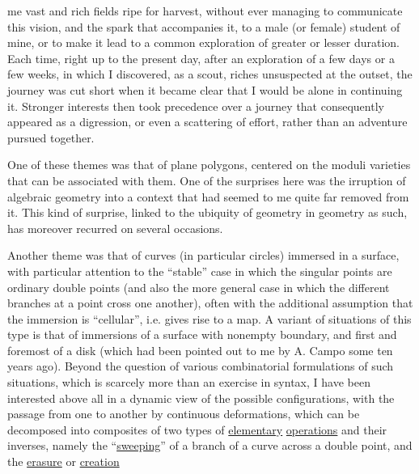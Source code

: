 
me vast and rich fields ripe for harvest, without
ever managing to communicate this vision, and the spark
that accompanies it, to a male (or female) student of mine, or to make it
lead to a common exploration of greater or lesser
duration. Each time, right up to the present day, after an exploration
of a few days or a few weeks, in which I discovered,
as a scout, riches unsuspected at the outset, the journey
was cut short when it became clear that I would be alone in
continuing it. Stronger interests then took precedence over
a journey that consequently appeared as a digression, or even
a scattering of effort, rather than an adventure pursued together.

One of these themes was that of plane polygons, centered
on the moduli varieties that can be associated with them. One of
the surprises here was the irruption of algebraic geometry into
a context that had seemed to me quite far removed from it. This kind of
surprise, linked to the ubiquity of geometry in geometry as
such, has moreover recurred on several occasions.

Another theme was that of curves (in particular
circles) immersed in a surface, with particular attention
to the ``stable'' case in which the singular points are ordinary
double points (and also the more general case in which the
different branches at a point cross one another), often with
the additional assumption that the immersion is ``cellular'',
i.e. gives rise to a map. A variant of situations of
this type is that of immersions of a surface with nonempty boundary,
and first and foremost of a disk (which had been pointed out to me by
A. Campo some ten years ago). Beyond the question of
various combinatorial formulations of such situations, which
is scarcely more than an exercise in syntax, I have been interested
above all in a dynamic view of the possible configurations,
with the passage from one to another by continuous deformations, which
can be decomposed into composites of two types of \uline{elementary}
\uline{operations} and their inverses, namely the ``\uline{sweeping}'' of a branch
of a curve across a double point, and the \uline{erasure} or \uline{creation}

